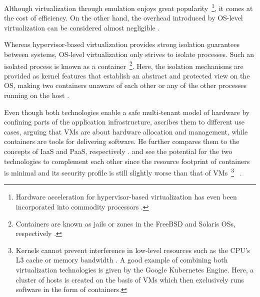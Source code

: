 Although virtualization through emulation enjoys great popularity~\footnote{Hardware acceleration for hypervisor-based virtualization has even been incorporated into commodity processors \cite[p.~233]{xavier2013performance}.}, it comes at the cost of efficiency. On the other hand, the overhead introduced by OS-level virtualization can be considered almost negligible \cite[pp.~386,~392]{morabito2015hypervisors}.

Whereas hypervisor-based virtualization provides strong isolation guarantees between systems, \acs{OS}-level virtualization only strives to isolate processes. Such an isolated process is known as a container~\footnote{Containers are known as jails or zones in the FreeBSD and Solaris \acsp{OS}, respectively \cite[p.~2]{eder2016hypervisor}.}. Here, the isolation mechanisms are provided as kernel features that establish an abstract and protected view on the \acs{OS}, making two containers unaware of each other or any of the other processes running on the host \cite[p.~2]{merkel2014docker} \cite[pp.~1--2]{eder2016hypervisor}.

Even though both technologies enable a safe multi-tenant model of hardware by confining parts of the application infrastructure, \citeauthor{pahl2015containerization} ascribes them to different use cases, arguing that \acp{VM} are about hardware allocation and management, while containers are tools for delivering software. He further compares them to the concepts of \acs{IaaS} and \acs{PaaS}, respectively \cite[p.~24]{pahl2015containerization}. \citeauthor{eder2016hypervisor} and \citeauthor{merkel2014docker} see the potential for the two technologies to complement each other since the resource footprint of containers is minimal and its security profile is still slightly worse than that of \acsp{VM}~\footnote{Kernels cannot prevent interference in low-level resources such as the \acs{CPU}'s L3 cache or memory bandwidth \cite[p.~52]{burns2016borg}. A good example of combining both virtualization technologies is given by the Google Kubernetes Engine. Here, a cluster of hosts is created on the basis of \acsp{VM} which then exclusively runs software in the form of containers.}~\cite[p.~6]{eder2016hypervisor} \cite[p.~2]{merkel2014docker}.

